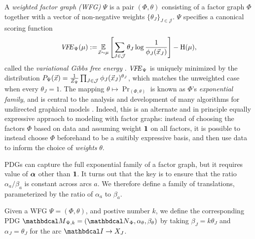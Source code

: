 A \emph{weighted factor graph (WFG)} $\Psi$ is a pair
$(\Phi,\theta)$ consisting of a factor graph $\Phi$ 
together with a vector of non-negative weights
$\{ \theta_J \}_{J \in \mathcal J}$.
$\Psi$ specifies a canonical scoring function 
\begin{equation}
\VFE_{\Psi}(\mu)
	 := \!\Ex_{\vec x\sim\mu}\left[  \sum_{J \in
           \cal J} \theta_J \log\frac1{\phi_J(\vec
               x_J)}\right] - \H(\mu)  , 
			   \label{eqn:free-energy}
\end{equation}
called the \emph{variational
Gibbs free energy} \citep{mezard2009information}. 
$\VFE_{\Psi}$ is uniquely minimized by the distribution
${\Pr}_{\Psi}(\vec x) = \frac{1}{Z_{\Psi}}
 	\prod_{J \in \cal J} \phi_J(\vec x_J)^{\theta_J}$, 
which matches the unweighted case when every $\theta_J = 1$.
The mapping $\theta \mapsto \Pr_{(\Phi,\theta)}$ is known as 
$\Phi$'s \emph{exponential family}, and is central to the analysis
and development of many algorithms for undirected 
graphical models \citep{wainwright2008graphical}.
Indeed, this is an alternate and in principle equally expressive 
appraoch to modeling with factor graphs: instead of choosing the factors $\Phi$
based on data and assuming weight $\mat 1$ on all factors,
it is possible to instead choose $\Phi$ beforehand to be a suitibly expressive basis, 
and then use data to inform the choice of \emph{weights} $\theta$. 


PDGs can capture the full exponential family of a factor graph, 
    but it requires value of $\balpha$ other than $\mat 1$. 
%
It turns out that the key is to ensure that the ratio $\alpha_a/\beta_a$ is constant across arcs $a$.  
We therefore define a family of translations, parameterized by the
ratio of $\alpha_a$ to $\beta_a$.
\begin{defn}\label{def:wfg2pdg}
Given a WFG
$\Psi=(\Phi, \theta)$,
and postive number $k$, 
we define the corresponding PDG $\PDGof{\Psi,k} = (\UPDGof{\Phi},\alpha_{\theta}, \beta_{\theta})$ 
by taking $\beta_J = k \theta_J$ and $\alpha_J = \theta_J$ for the arc
 $\pdgunit  \rightarrow X_J$.
\end{defn}

